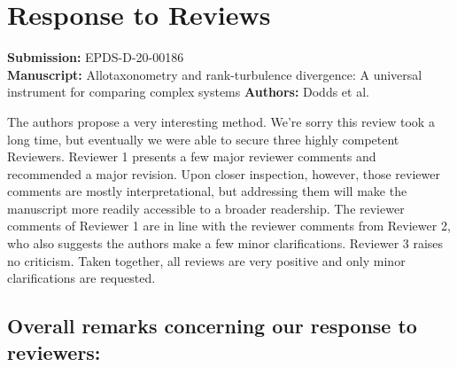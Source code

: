 \section*{Response to Reviews}

\textbf{Submission:} EPDS-D-20-00186 \\
\textbf{Manuscript:} 
Allotaxonometry and rank-turbulence divergence: A universal instrument for comparing complex systems
\textbf{Authors:} Dodds et al.

\begin{editorcomment}
  The authors propose a very interesting method. We're sorry this review
  took a long time, but eventually we were able to secure three highly
  competent Reviewers. Reviewer 1 presents a few major reviewer comments
  and recommended a major revision. Upon closer inspection, however,
  those reviewer comments are mostly interpretational, but addressing
  them will make the manuscript more readily accessible to a broader
  readership. The reviewer comments of Reviewer 1 are in line with the
  reviewer comments from Reviewer 2, who also suggests the authors make a
  few minor clarifications. Reviewer 3 raises no criticism. Taken
  together, all reviews are very positive and only minor clarifications
  are requested.
\end{editorcomment}

\subsection*{Overall remarks concerning our response to reviewers:}

